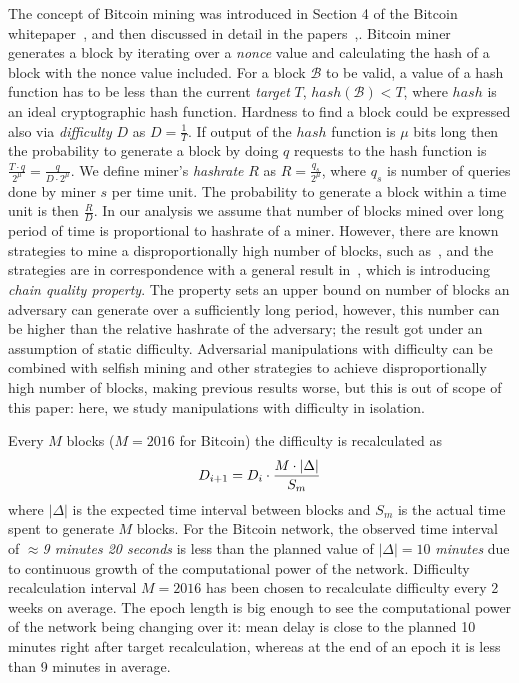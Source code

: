 \documentclass[]{llncs}
\newcommand{\texp}{|\Delta|}
\newcommand{\block}{\mathcal{B}}
\begin{document}
The concept of Bitcoin mining was introduced in Section 4 of the Bitcoin whitepaper~\cite{Nakamoto2008}, and then discussed in detail in the papers~\cite{kraft2015difficulty},\cite{gkl16}. Bitcoin miner generates a block by iterating over a {\em nonce} value and calculating the hash of a block with the nonce value included. For a block $\block$ to be valid, a value of a hash function has to be less than the current {\em target} $T$, $hash(\block) < T$, where $hash$ is an ideal cryptographic hash function. Hardness to find a block could be expressed also via {\em difficulty} $D$ as $D = \frac{1}{T}$. If output of the $hash$ function is $\mu$ bits long then the probability to generate a block by doing $q$ requests to the hash function is $\frac{T \cdot q}{2^\mu} = \frac{q}{D \cdot 2^\mu}$. We define miner's {\em hashrate} $R$ as $R = \frac{q_s}{2^\mu}$, where $q_s$ is number of queries done by miner $s$ per time unit. The probability to generate a block within a time unit is then $\frac{R}{D}$. In our analysis we assume that number of blocks mined over  long period of time is proportional to hashrate of a miner. However, there are known strategies to mine a disproportionally high number of blocks, such as~\cite{selfish}, and the strategies are in correspondence with a general result in~\cite{garay2015bitcoin}, which is introducing {\em chain quality property}. The property sets an upper bound on number of blocks an adversary can generate over a sufficiently long period, however, this number can be higher than the relative hashrate of the adversary; the result got under an assumption of static difficulty. Adversarial manipulations with difficulty can be combined with selfish mining and other strategies to achieve disproportionally high number of blocks, making previous results worse, but this is out of scope of this paper: here, we study manipulations with difficulty in isolation. 


Every $M$ blocks ($M = 2016$ for Bitcoin) the difficulty is recalculated as
\begin{equation}
D_{i+1}=D_i \cdot {M \cdot \texp \over S_m}
\end{equation}
where $\texp$ is the expected time interval between blocks and $S_m$ is the actual time spent to generate $M$ blocks.
For the Bitcoin network, the observed time interval of $\approx${\em 9 minutes 20 seconds} is less than the planned value of $\texp = 10$ {\em minutes} due to continuous growth of the computational power of the network.
Difficulty recalculation interval $M=2016$ has been chosen to recalculate difficulty every 2 weeks on average.
The epoch length is big enough to see the computational power of the network being changing over it: mean delay is close to the planned 10 minutes right after target recalculation, whereas at the end of an epoch it is less than 9 minutes in average.
\end{document}
